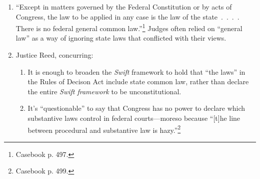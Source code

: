 \begin{enumerate}
\begin{enumerate}
        mistakenly interpreted the Rules of Decision Act as requiring federal 
        courts to follow state common law even in areas where federal common 
        law applied.)
        \item \emph{Swift} caused significant ``injustice and 
        confusion''\footnote{Casebook p. 501}---e.g., companies 
        reincorporating in other states in order to establish diversity 
        jurisdiction to have their cases tried in federal court (\emph{Black 
        \& White Taxicab}). ``\emph{Swift v. Tyson} introduced grave 
        discrimination by noncitizens against citizens.''\footnote{Casebook p. 
        496.}
        \item The federal government did not have the power to legislate rules 
        of tort or contract law.\footnote{This quickly became untrue as the 
        Court expanded the federal government's power to regulate these areas 
        under the Commerce Clause.} Federal courts also do not have the power 
        to create rules in these areas.
        \item Reversed and remanded to be decided on the basis of Pennsylvania 
        state law.
        \item The \emph{Swift} rule is overturned.
    \end{enumerate}
    \item ``Except in matters governed by the Federal Constitution or by acts 
    of Congress, the law to be applied in any case is the law of the state~.~.~.~.  
    There is no federal general common law.''\footnote{Casebook p. 497.} 
    Judges often relied on ``general law'' as a way of ignoring state laws 
    that conflicted with their views.
    \item Justice Reed, concurring:
    \begin{enumerate}
        \item It is enough to broaden the \emph{Swift} framework to hold that 
        ``the laws'' in the Rules of Decison Act include state common law, 
        rather than declare the entire \emph{Swift framework} to be 
        unconstitutional.
        \item It's ``questionable'' to say that Congress has no power to 
        declare which substantive laws control in federal courts---moreso 
        because ``[t]he line between procedural and substantive law is 
        hazy.''\footnote{Casebook p. 499.}
    \end{enumerate}
\end{enumerate}


